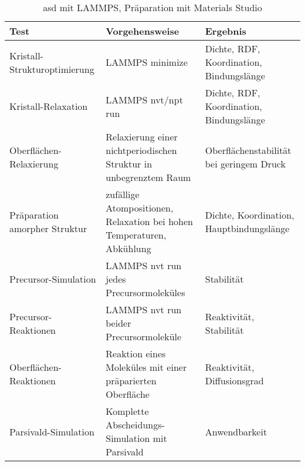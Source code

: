 \begin{table}
  \oddrowcolors
  \begin{tabularx}{\textwidth}{|lXX|}
    \hline
    \textbf{Test} & \textbf{Vorgehensweise} & \textbf{Ergebnis} \\
    \hline
    Kristall-Strukturoptimierung & LAMMPS minimize & Dichte, RDF, Koordination, Bindungslänge \\
    Kristall-Relaxation & LAMMPS nvt/npt run & Dichte, RDF, Koordination, Bindungslänge \\
    Oberflächen-Relaxierung & Relaxierung einer nichtperiodischen Struktur in unbegrenztem Raum  & Oberflächenstabilität bei geringem Druck \\
    Präparation amorpher Struktur & zufällige Atompositionen, Relaxation bei hohen Temperaturen, Abkühlung & Dichte, Koordination, Hauptbindungslänge \\
    Precursor-Simulation & LAMMPS nvt run jedes Precursormoleküles & Stabilität \\
    Precursor-Reaktionen & LAMMPS nvt run beider Precursormoleküle & Reaktivität, Stabilität \\
    Oberflächen-Reaktionen & Reaktion eines Moleküles mit einer präparierten Oberfläche & Reaktivität, Diffusionsgrad \\
    Parsivald-Simulation & Komplette Abscheidungs-Simulation mit Parsivald & Anwendbarkeit \\
    \hline
  \end{tabularx}
  \caption[asd]{asd mit LAMMPS, Präparation mit Materials Studio}
  \label{tab:mdtestvariants}
\end{table}
